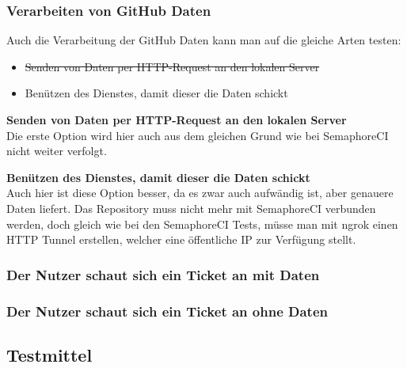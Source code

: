 \begin{minipage}{\textwidth}
  \subsubsection{Verarbeiten von GitHub Daten}
  Auch die Verarbeitung der GitHub Daten kann man auf die gleiche Arten testen:
  \begin{itemize}
    \item \st{Senden von Daten per HTTP-Request an den lokalen Server}
    \item Benützen des Dienstes, damit dieser die Daten schickt \newline
  \end{itemize}
  \textbf{Senden von Daten per HTTP-Request an den lokalen Server} \\
  Die erste Option wird hier auch aus dem gleichen Grund wie bei SemaphoreCI nicht weiter verfolgt. \newline

  \textbf{Benützen des Dienstes, damit dieser die Daten schickt} \\
  Auch hier ist diese Option besser, da es zwar auch aufwändig ist, aber genauere Daten liefert. \newline
  Das Repository muss nicht mehr mit SemaphoreCI verbunden werden, doch gleich wie bei den SemaphoreCI Tests, müsse man
  mit ngrok \cite{ngrok_http_docs} einen HTTP Tunnel erstellen, welcher eine öffentliche IP zur Verfügung stellt.
\end{minipage}
\subsubsection{Der Nutzer schaut sich ein Ticket an mit Daten}
\subsubsection{Der Nutzer schaut sich ein Ticket an ohne Daten}

\subsection{Testmittel}
